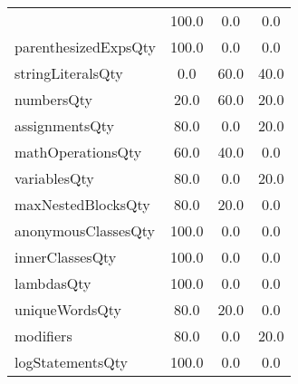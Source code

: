 \begin{tabular}{lccc}
{tryCatchQty & 100.0 & 0.0 & 0.0 \\
parenthesizedExpsQty & 100.0 & 0.0 & 0.0 \\
stringLiteralsQty & 0.0 & 60.0 & 40.0 \\
numbersQty & 20.0 & 60.0 & 20.0 \\
assignmentsQty & 80.0 & 0.0 & 20.0 \\
mathOperationsQty & 60.0 & 40.0 & 0.0 \\
variablesQty & 80.0 & 0.0 & 20.0 \\
maxNestedBlocksQty & 80.0 & 20.0 & 0.0 \\
anonymousClassesQty & 100.0 & 0.0 & 0.0 \\
innerClassesQty & 100.0 & 0.0 & 0.0 \\
lambdasQty & 100.0 & 0.0 & 0.0 \\
uniqueWordsQty & 80.0 & 20.0 & 0.0 \\
modifiers & 80.0 & 0.0 & 20.0 \\
logStatementsQty & 100.0 & 0.0 & 0.0 \\
\bottomrule
              \end{tabular}
            